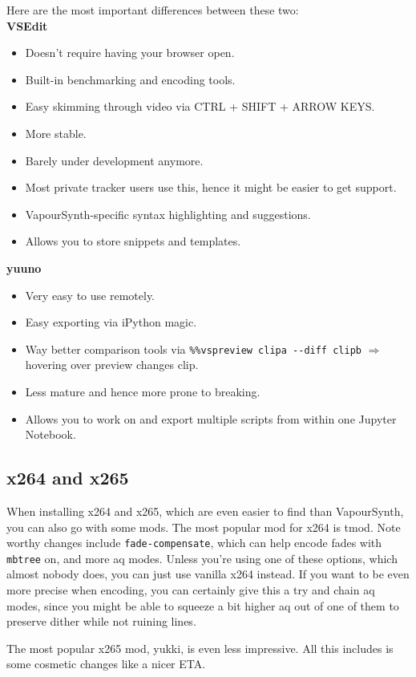 \documentclass{scrartcl}
\begin{document}
Here are the most important differences between these two:\\
\textbf{VSEdit}
\begin{itemize}
\item Doesn't require having your browser open.
\item Built-in benchmarking and encoding tools.
\item Easy skimming through video via CTRL + SHIFT + ARROW KEYS.
\item More stable.
\item Barely under development anymore.
\item Most private tracker users use this, hence it might be easier to get support.
\item VapourSynth-specific syntax highlighting and suggestions.
\item Allows you to store snippets and templates.
\end{itemize}
\textbf{yuuno}
\begin{itemize}
\item Very easy to use remotely.
\item Easy exporting via iPython magic.
\item Way better comparison tools via \texttt{\%\%vspreview clipa -{}-diff clipb} $\Rightarrow$ hovering over preview changes clip.
\item Less mature and hence more prone to breaking.
\item Allows you to work on and export multiple scripts from within one Jupyter Notebook.
\end{itemize}

\subsection{x264 and x265}

When installing x264 and x265, which are even easier to find than VapourSynth, you can also go with some mods.  The most popular mod for x264 is tmod.  Note worthy changes include \texttt{fade-compensate}, which can help encode fades with \texttt{mbtree} on, and more aq modes.  Unless you're using one of these options, which almost nobody does, you can just use vanilla x264 instead.  If you want to be even more precise when encoding, you can certainly give this a try and chain aq modes, since you might be able to squeeze a bit higher aq out of one of them to preserve dither while not ruining lines.

The most popular x265 mod, yukki, is even less impressive.  All this includes is some cosmetic changes like a nicer ETA.
\end{document}
